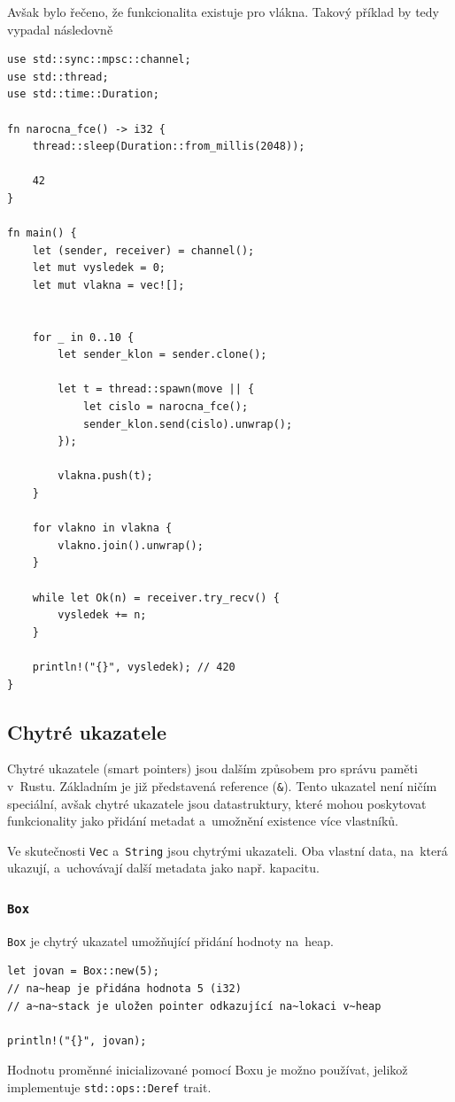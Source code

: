 \documentclass[a4paper, 12pt]{article} %
\newcommand{\rust}[1]{\texttt{#1}}
\begin{document}
			Avšak bylo řečeno, že funkcionalita existuje pro vlákna. Takový příklad by tedy vypadal následovně
			\begin{verbatim}
use std::sync::mpsc::channel;
use std::thread;
use std::time::Duration;

fn narocna_fce() -> i32 {
	thread::sleep(Duration::from_millis(2048));

	42
} 

fn main() {
	let (sender, receiver) = channel();
	let mut vysledek = 0;
	let mut vlakna = vec![];


	for _ in 0..10 {
		let sender_klon = sender.clone();

		let t = thread::spawn(move || {
			let cislo = narocna_fce();
			sender_klon.send(cislo).unwrap();
		});

		vlakna.push(t);
	}
	
	for vlakno in vlakna {
		vlakno.join().unwrap();
	}
	
	while let Ok(n) = receiver.try_recv() {
		vysledek += n;
	}

	println!("{}", vysledek); // 420
}
			\end{verbatim}
			\cite{kanaly}


	\subsection{Chytré ukazatele}
		Chytré ukazatele (smart pointers) jsou dalším způsobem pro správu paměti v~Rustu. Základním je již představená reference (\rust{&}). Tento ukazatel není ničím speciální, avšak chytré ukazatele jsou datastruktury, které mohou poskytovat funkcionality jako přidání metadat a~umožnění existence více vlastníků.
		
		Ve skutečnosti \rust{Vec} a~\rust{String} jsou chytrými ukazateli. Oba vlastní data, na~která ukazují, a~uchovávají další metadata jako např. kapacitu.
		
		\subsubsection*{\rust{Box}}
			\rust{Box} je chytrý ukazatel umožňující přidání hodnoty na~heap.
			\begin{verbatim}
let jovan = Box::new(5);
// na~heap je přidána hodnota 5 (i32)
// a~na~stack je uložen pointer odkazující na~lokaci v~heap

println!("{}", jovan);
			\end{verbatim}
			
			Hodnotu proměnné inicializované pomocí Boxu je možno používat, jelikož implementuje \rust{std::ops::Deref} trait.
			
\end{document}
